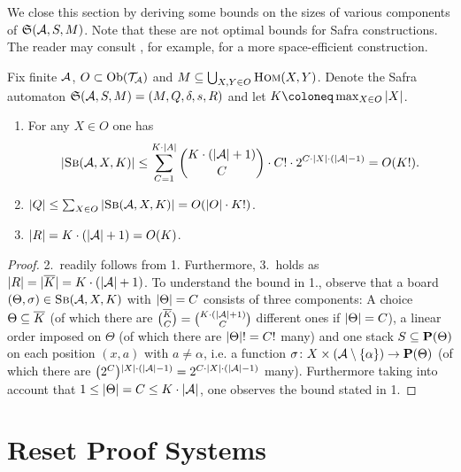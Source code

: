 We close this section by deriving some bounds on the sizes of various components
of $\mathfrak{S}(\mathcal{A}, S, M)$. Note that these are not optimal bounds for Safra
constructions. The reader may consult
\parencite{pitermanNondeterministicBuchiStreett}, for example, for a more space-efficient
construction.

\begin{lemma}\label{lem:complexity}
  Fix finite $\mathcal{A}$, $O \subset \mathrm{Ob}(\mathcal{T}_{\mathcal{A}})$ and $M \subseteq \bigcup_{X, Y
    \in O} \textsc{Hom}(X, Y)$. Denote the Safra automaton $\mathfrak{S}(\mathcal{A}, S, M) = (M, Q,
  \delta, s, R)$ and let $K \coloneq \max_{X \in O} \abs{X}$.
  \begin{enumerate}
  \item For any $X \in O$ one has
    \[
      |\textsc{Sb}(\mathcal{A}, X, K)| \leq \sum_{C = 1}^{K \cdot |A|} {
        K \cdot (|\mathcal{A}| + 1) \choose C} \cdot C! \cdot 2^{C \cdot |X| \cdot
        (|\mathcal{A}| - 1)} = O(K!).
    \]
\item $|Q| \leq \sum_{X \in O} |\textsc{Sb}(\mathcal{A}, X, K)| = O(|O| \cdot K!)$.
\item $|R| = K \cdot (|\mathcal{A}| + 1) = O(K)$.
  \end{enumerate}
\end{lemma}
\begin{proof}
  2.~readily follows from 1. Furthermore, 3.~holds as $|R| = |\overline{K}| =
  K \cdot (|\mathcal{A}| + 1)$. To understand the bound in 1., observe that
  a board $(\Theta, \sigma) \in \textsc{Sb}(\mathcal{A}, X, K)$ with $|\Theta| = C$ consists
  of three components: A choice $\Theta \subseteq \overline{K}$ (of which there are
  ${\overline{K} \choose C} = {K \cdot (|\mathcal{A}| + 1) \choose C}$ different ones
  if $|\Theta| = C$), a linear order imposed on $\Theta$ (of which there are
  $|\Theta|! = C!$ many) and one stack $S
  \subseteq \textbf{P}(\Theta)$ on each position $(x, a)$ with $a \neq \alpha$, i.e. a
  function $\sigma \colon X \times (\mathcal{A} \setminus \{\alpha\}) \to \textbf{P}(\Theta)$ (of
  which there are ${\bigl(2^{C}\bigr)}{}^{|X| \cdot (|\mathcal{A}| - 1)} = 2^{C \cdot |X|
    \cdot (|\mathcal{A}| - 1)}$ many).
    Furthermore taking into account that
  $1 \leq |\Theta| = C \leq K \cdot |\mathcal{A}|$, one observes the bound
  stated in 1.
\end{proof}

\section{Reset Proof Systems}
\label{sec:acd-pwn}

